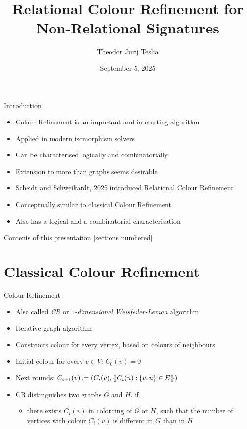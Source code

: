 \documentclass[aspectratio=169]{beamer}
\title{Relational Colour Refinement for Non-Relational Signatures}
\date{September 5, 2025}
\author{Theodor Jurij Teslia}
\institute{RWTH Aachen University}
\def\multiset#1{\ensuremath{\left\{\kern-.35em\left\{#1\right\}\kern-.35em\right\}}}
\begin{document}
	
	\maketitle
	
	\begin{frame}{Introduction}
		\begin{itemize}
			\item Colour Refinement is an important and interesting algorithm
			\item Applied in modern isomorphism solvers
			\item Can be characterised logically and combinatorially
			\item Extension to more than graphs seems desirable
			\item Scheidt and Schweikardt, 2025 introduced Relational Colour Refinement
			\item Conceptually similar to classical Colour Refinement
			\item Also has a logical and a combinatorial characterisation
		\end{itemize}
	\end{frame}
	
	\begin{frame}{Contents of this presentation}
		[sections numbered]
		\tableofcontents[hideallsubsections]
	\end{frame}
	
	\section{Classical Colour Refinement}
	
	\begin{frame}{Colour Refinement}
		\begin{itemize}
			\item Also called \emph{CR} or \emph{$1$-dimensional Weisfeiler-Leman} algorithm
			\item Iterative graph algorithm
			\item Constructs colour for every vertex, based on colours of neighbours
			\item Initial colour for every $v\in V$: $C_0(v)=0$
			\item Next rounds: $C_{i+1}(v)\coloneqq(C_i(v),\multiset{C_i(u) : \{v,u\}\in E})$
			\item CR distinguishes two graphs $G$ and $H$, if
			\begin{itemize}
				\item there exists $C_i(v)$ in colouring of $G$ or $H$, such that the number of vertices with colour $C_i(v)$ is different in $G$ than in $H$
			\end{itemize}
		\end{itemize}
	\end{frame}
	
\end{document}
